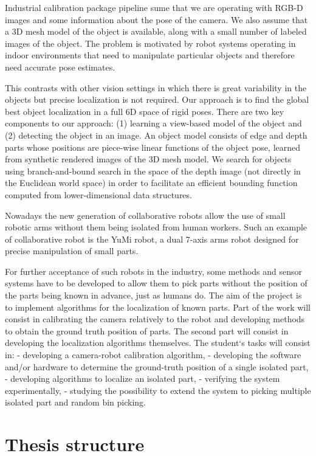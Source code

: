 Industrial calibration package pipeline sume that we are operating with RGB-D images and some information about the pose of the camera. We also assume that a 3D mesh model of the object is available, along with a small number of labeled images of the object. The problem is motivated by robot systems operating in indoor environments that need to manipulate particular objects and therefore need accurate pose estimates.

This contrasts with other vision settings in which there is great variability in the objects but precise localization is not required. Our approach is to find the global best object localization in a full 6D space of rigid poses. There are two key components to our approach: (1) learning a view-based model of the object and (2) detecting the object in an image. An object model consists of edge and depth parts whose positions are piece-wise linear functions of the object pose, learned from synthetic rendered images of the 3D mesh model. We search for objects using branch-and-bound search in the space of the depth image (not directly in the Euclidean world space) in order to facilitate an efficient bounding function computed from lower-dimensional data structures.

Nowadays the new generation of collaborative robots allow the use of small robotic arms without them being isolated from human workers. Such an example of collaborative robot is the YuMi robot, a dual 7-axis arms robot designed for precise manipulation of small parts.

For further acceptance of such robots in the industry, some methods and sensor systems have to be developed to allow
them to pick parts without the position of the parts being known in advance, just as humans do.
The aim of the project is to implement algorithms for the localization of known parts. Part of the work will consist in calibrating
the camera relatively to the robot and developing methods to obtain the ground truth position of parts. The second part
will consist in developing the localization algorithms themselves.
The student‘s tasks will consist in:
- developing a camera-robot calibration algorithm,
- developing the software and/or hardware to determine the ground-truth position of a single isolated part,
- developing algorithms to localize an isolated part,
- verifying the system experimentally,
- studying the possibility to extend the system to picking multiple isolated part and random bin picking.

\section{Thesis structure}


